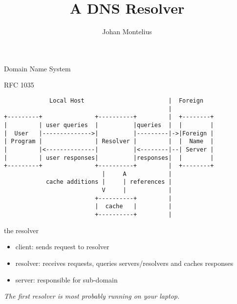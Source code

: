 
 
 
\title[ID1019 DNS]{A DNS Resolver}
 

\author{Johan Montelius}
\date{\semester}



\begin{frame}
\titlepage
\end{frame}

\begin{frame}{Domain Name System}

\end{frame}

\begin{frame}[fragile]{RFC 1035}

\begin{verbatim}
             Local Host                        |  Foreign
                                               |
+---------+               +----------+         |  +--------+
|         | user queries  |          |queries  |  |        |
|  User   |-------------->|          |---------|->|Foreign |
| Program |               | Resolver |         |  |  Name  |
|         |<--------------|          |<--------|--| Server |
|         | user responses|          |responses|  |        |
+---------+               +----------+         |  +--------+
                            |     A            |
            cache additions |     | references |
                            V     |            |
                          +----------+         |
                          |  cache   |         |
                          +----------+         |
\end{verbatim}

\end{frame}


\begin{frame}{the resolver}

\begin{itemize}
\item client: sends request to resolver
\item resolver: receives requests, queries servers/resolvers and caches responses 
\item server: responsible for sub-domain
\end{itemize}

\vspace{10pt}\pause  

{\em The first resolver is most probably running on your laptop.}
\end{frame}


